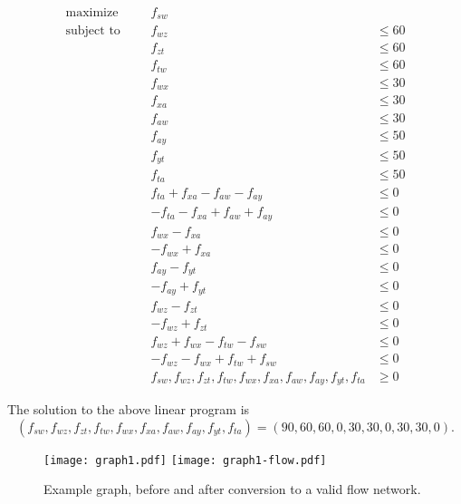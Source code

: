 \documentclass[a4paper, 10pt, oneside, article]{memoir}
\begin{document}
\begin{align*}
  \text{maximize}   &&& f_{sw} \\
  \text{subject to} &&& f_{wz} &\leq 60 \\
                    &&& f_{zt} &\leq 60 \\
                    &&& f_{tw} &\leq 60 \\
                    &&& f_{wx} &\leq 30 \\
                    &&& f_{xa} &\leq 30 \\
                    &&& f_{aw} &\leq 30 \\
                    &&& f_{ay} &\leq 50 \\
                    &&& f_{yt} &\leq 50 \\
                    &&& f_{ta} &\leq 50 \\
                    &&& f_{ta} + f_{xa}  - f_{aw} - f_{ay} & \leq 0 \\
                    &&& -f_{ta} - f_{xa}  + f_{aw} + f_{ay} & \leq 0 \\
                    &&& f_{wx} - f_{xa} &\leq 0 \\
                    &&& -f_{wx} + f_{xa} &\leq 0 \\
                    &&& f_{ay} - f_{yt} &\leq 0 \\
                    &&& -f_{ay} + f_{yt} &\leq 0 \\
                    &&& f_{wz} - f_{zt} &\leq 0 \\
                    &&& -f_{wz} + f_{zt} &\leq 0 \\
                    &&& f_{wz} + f_{wx} - f_{tw} - f_{sw} & \leq 0 \\
                    &&& -f_{wz} - f_{wx} + f_{tw} + f_{sw} & \leq 0 \\
                    &&& f_{sw}, f_{wz}, f_{zt}, f_{tw}, f_{wx}, f_{xa}, f_{aw}, f_{ay}, f_{yt}, f_{ta} &\geq 0
\end{align*}

The solution to the above linear program is
$$(f_{sw}, f_{wz}, f_{zt}, f_{tw}, f_{wx}, f_{xa}, f_{aw}, f_{ay}, f_{yt}, f_{ta}) = (90, 60, 60, 0, 30, 30, 0, 30, 30, 0).$$

\begin{figure}[h]
  \centering
  \texttt{[image: graph1.pdf]}
  \texttt{[image: graph1-flow.pdf]}
  \caption{Example graph, before and after conversion to a valid flow
    network.}
  \label{fig:example-graph}
\end{figure}
\end{document}

